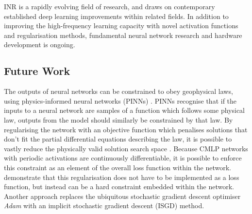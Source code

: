 INR is a rapidly evolving field of research, and draws on contemporary established deep learning improvements within related fields.
In addition to improving the high-frequency learning capacity with novel activation functions and regularisation methods, fundamental neural network research and hardware development is ongoing.




\subsection{Future Work}
\label{sec:future}
The outputs of neural networks can be constrained to obey geophysical laws, using physics-informed neural networks (PINNs) \parencite{raissiPhysicsinformedNeuralNetworks2019}.
PINNs recognise that if the inputs to a neural network are samples of a function which follows some physical law, outputs from the model should similarly be constrained by that law.
By regularising the network with an objective function which penalises solutions that don't fit the partial differential equations describing the law, it is possible to vastly reduce the physically valid solution search space \parencite{raissiPhysicsinformedNeuralNetworks2019}.
Because CMLP networks with periodic activations are continuously differentiable, it is possible to enforce this constraint as an element of the overall loss function within the network.
\Textcite{sethiHardEnforcementPhysicsinformed2023} demonstrate that this regularisation does not have to be implemented as a loss function, but instead can be a hard constraint embedded within the network.
Another approach \parencite{liImplicitStochasticGradient2023} replaces the ubiquitous stochastic gradient descent optimiser \emph{Adam} with an implicit stochastic gradient descent (ISGD) method.

